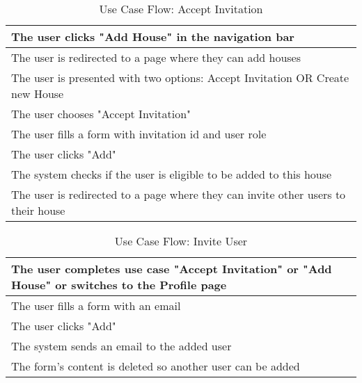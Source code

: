 \begin{table}[H]
  \begin{tabularx}{\linewidth}{|X|}
    \hline
     The user clicks "Add House" in the navigation bar \\
     \hline
     The user is redirected to a page where they can add houses \\
     \hline
     The user is presented with two options: Accept Invitation OR Create new House \\
     \hline 
     The user chooses "Accept Invitation" \\
     \hline 
     The user fills a form with invitation id and user role \\
     \hline
     The user clicks "Add" \\
     \hline  
     The system checks if the user is eligible to be added to this house \\
     \hline  
     The user is redirected to a page where they can invite other users to their house \\
     \hline  
  \end{tabularx}
  \caption{Use Case Flow: Accept Invitation}
\end{table}

\begin{table}[H]
  \begin{tabularx}{\linewidth}{|X|}
    \hline
     The user completes use case "Accept Invitation" or "Add House" or switches to the Profile page \\
     \hline
     The user fills a form with an email \\
     \hline
     The user clicks "Add" \\
     \hline 
     The system sends an email to the added user \\
     \hline
     The form's content is deleted so another user can be added \\
     \hline  
  \end{tabularx}
  \caption{Use Case Flow: Invite User}
\end{table}